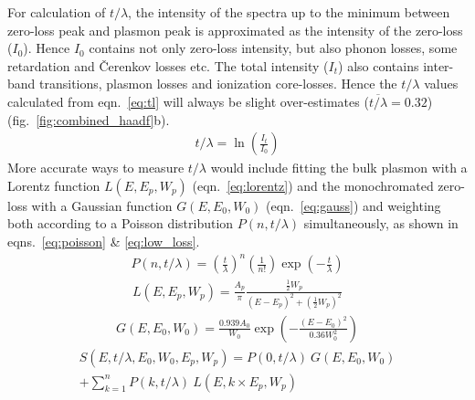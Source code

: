 \documentclass[%
aip,
rsi,%
 amsmath,amssymb,%
 reprint,%
]{revtex4-1}
\begin{document}
For calculation of $t/\lambda$, the intensity of the spectra up to the minimum between zero-loss peak and plasmon peak is approximated as the intensity of the zero-loss ($I_0$). Hence $I_0$ contains not only zero-loss intensity, but also phonon losses, some retardation and \v{C}erenkov losses etc. The total intensity ($I_t$) also contains inter-band transitions, plasmon losses and ionization core-losses. Hence the $t/\lambda$ values calculated from eqn.~\ref{eq:tl} will always be slight over-estimates ($\overline{t/\lambda}=0.32$) (fig.~\ref{fig:combined_haadf}b).
\begin{align}
	t/\lambda = \operatorname{ln}\left(\frac{I_t}{I_0}\right)
    \label{eq:tl}
\end{align}
More accurate ways to measure $t/\lambda$ would include fitting the bulk plasmon with a Lorentz function $L(E,E_p,W_p)$ (eqn.~\ref{eq:lorentz}) and the monochromated zero-loss with a Gaussian function $G(E,E_0,W_0)$ (eqn.~\ref{eq:gauss}) and weighting both according to a Poisson distribution $P(n,t/\lambda)$ simultaneously, as shown in eqns.~\ref{eq:poisson} \& \ref{eq:low_loss}.
\begin{align}
	P(n,t/\lambda) = \left(\frac{t}{\lambda}\right)^n\left(\frac{1}{n!}\right)\operatorname{exp}\left(-\frac{t}{\lambda}\right)
    \label{eq:poisson}
\end{align}
\begin{align}
	L(E,E_p,W_p) = \frac{A_p}{\pi} \frac{\frac{1}{2}W_p}{(E-E_p)^2+\left(\frac{1}{2}W_p\right)^2}
    \label{eq:lorentz}
\end{align}
\begin{align}
	G(E,E_0,W_0) = \frac{0.939A_0}{W_0}\operatorname{exp}\left(-\frac{(E-E_0)^2}{0.36W_0^2}\right)
    \label{eq:gauss}
\end{align}
\begin{align}
	S(E,t/\lambda,E_0,W_0,E_p,W_p) = P(0,t/\lambda)~G(E,E_0,W_0) \nonumber \\
     +\sum_{k=1}^{n}P(k,t/\lambda)~L(E,k\times E_p,W_p)    \label{eq:low_loss}
\end{align}
\end{document}
